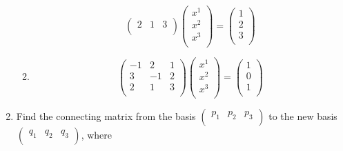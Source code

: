 \documentclass[../psets.tex]{subfiles}
\begin{document}
\begin{enumerate}
\begin{enumerate}
\begin{equation*}
\begin{pmatrix}
                2 & 1 & 3\\
            \end{pmatrix}
            \begin{pmatrix}
                x^1\\
                x^2\\
                x^3\\
            \end{pmatrix}
            =
            \begin{pmatrix}
                1\\
                2\\
                3\\
            \end{pmatrix}
        \end{equation*}
        \item 
        \begin{equation*}
            \begin{pmatrix}
                -1 & 2 & 1\\
                3 & -1 & 2\\
                2 & 1 & 3\\
            \end{pmatrix}
            \begin{pmatrix}
                x^1\\
                x^2\\
                x^3\\
            \end{pmatrix}
            =
            \begin{pmatrix}
                1\\
                0\\
                1\\
            \end{pmatrix}
        \end{equation*}
    \end{enumerate}
    \item Find the connecting matrix from the basis $
        \begin{pmatrix}
            p_1 & p_2 & p_3\\
        \end{pmatrix}
    $ to the new basis $
        \begin{pmatrix}
            q_1 & q_2 & q_3\\
        \end{pmatrix}
    $, where

\end{enumerate}
\end{document}
